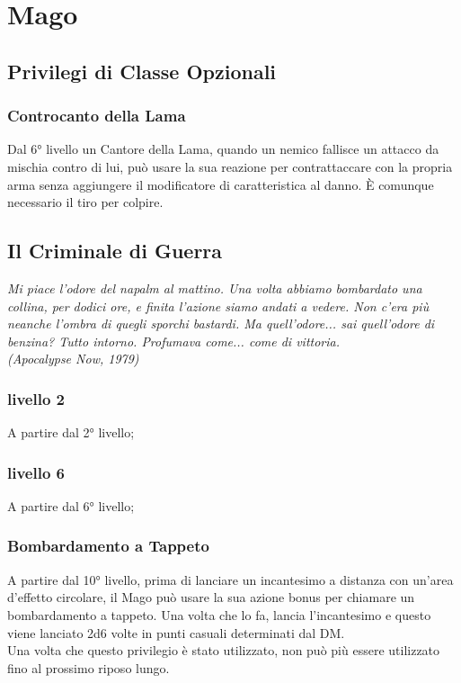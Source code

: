 \chapter{Mago}

\section{Privilegi di Classe Opzionali}

\subsection{Controcanto della Lama}

Dal 6° livello un Cantore della Lama, quando un nemico fallisce un attacco da mischia contro di lui, può usare la sua reazione per contrattaccare con la propria arma senza aggiungere il modificatore di caratteristica al danno. È comunque necessario il tiro per colpire.

\section{Il Criminale di Guerra}

\begin{DndReadAloud}
    \it
    Mi piace l'odore del napalm al mattino. Una volta abbiamo bombardato una collina, per dodici ore, e finita l'azione siamo andati a vedere. Non c'era più neanche l'ombra di quegli sporchi bastardi. Ma quell'odore... sai quell'odore di benzina? Tutto intorno. Profumava come... come di vittoria.\\ (Apocalypse Now, 1979)
\end{DndReadAloud}

\subsection{livello 2}
A partire dal 2° livello;

\subsection{livello 6}
A partire dal 6° livello;

\subsection{Bombardamento a Tappeto}
A partire dal 10° livello, prima di lanciare un incantesimo a distanza con un'area d'effetto circolare, il Mago può usare la sua azione bonus per chiamare un bombardamento a tappeto. Una volta che lo fa, lancia l'incantesimo e questo viene lanciato 2d6 volte in punti casuali determinati dal DM.\\ Una volta che questo privilegio è stato utilizzato, non può più essere utilizzato fino al prossimo riposo lungo.

